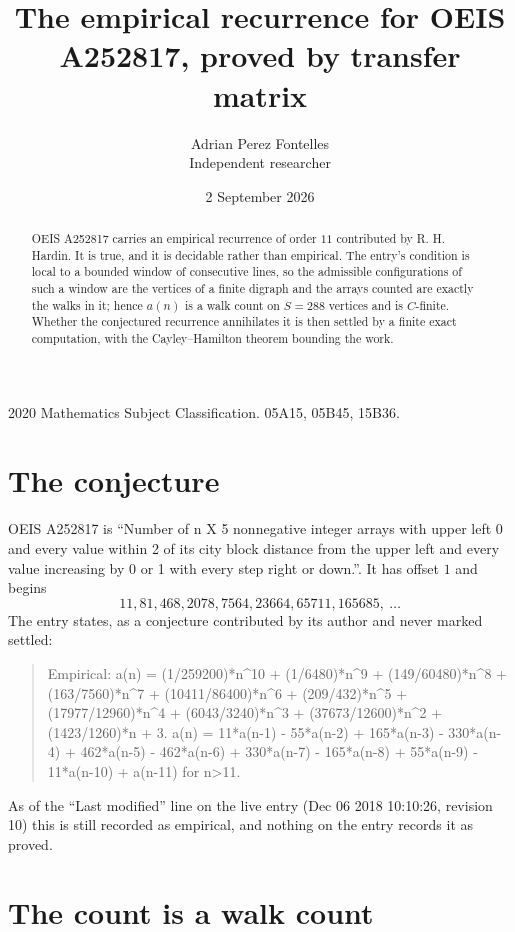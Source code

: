 \documentclass[11pt,a4paper]{article}
\title{The empirical recurrence for OEIS A252817, proved by transfer matrix}
\author{Adrian Perez Fontelles\\ \small Independent researcher}
\date{2 September 2026}
\theoremstyle{plain}
\theoremstyle{definition}
\begin{document}
\maketitle

\begin{abstract}
OEIS A252817 carries an empirical recurrence of order $11$ contributed by R. H. Hardin. It is
true, and it is decidable rather than empirical. The entry's condition is local to a bounded window of consecutive lines, so
the admissible configurations of such a window are the vertices of a finite digraph and the
arrays counted are exactly the walks in it; hence $a(n)$ is a walk count on $S=288$ vertices
and is $C$-finite. Whether the conjectured recurrence annihilates it is then settled by a
finite exact computation, with the Cayley--Hamilton theorem bounding the work.
\end{abstract}

\noindent\small 2020 Mathematics Subject Classification. 05A15, 05B45, 15B36.\normalsize

\section{The conjecture}

OEIS A252817 is ``Number of n X 5 nonnegative integer arrays with upper left 0 and every value within 2 of its city block distance from the upper left and every value increasing by 0 or 1 with every step right or down.''. It has offset $1$ and begins
\[
11, 81, 468, 2078, 7564, 23664, 65711, 165685,\ \dots
\]
The entry states, as a conjecture contributed by its author and never marked settled:
\begin{quote}
Empirical: a(n) = (1/259200)*n\^{}10 + (1/6480)*n\^{}9 + (149/60480)*n\^{}8 + (163/7560)*n\^{}7 + (10411/86400)*n\^{}6 + (209/432)*n\^{}5 + (17977/12960)*n\^{}4 + (6043/3240)*n\^{}3 + (37673/12600)*n\^{}2 + (1423/1260)*n + 3. a(n) = 11*a(n-1) - 55*a(n-2) + 165*a(n-3) - 330*a(n-4) + 462*a(n-5) - 462*a(n-6) + 330*a(n-7) - 165*a(n-8) + 55*a(n-9) - 11*a(n-10) + a(n-11) for n>11.
\end{quote}
As of the ``Last modified'' line on the live entry (Dec 06 2018 10:10:26, revision 10) this is still
recorded as empirical, and nothing on the entry records it as proved.

\section{The count is a walk count}
\end{document}
